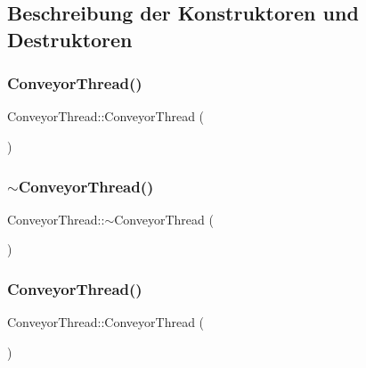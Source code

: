 \subsection{Beschreibung der Konstruktoren und Destruktoren}
\hypertarget{class_conveyor_thread_a2068e0741d46acdd2738d65447b594b6}{}\label{class_conveyor_thread_a2068e0741d46acdd2738d65447b594b6} 
\subsubsection{\texorpdfstring{Conveyor\+Thread()}{ConveyorThread()}\hspace{0.1cm}{\footnotesize\ttfamily [1/2]}}
{\footnotesize\ttfamily Conveyor\+Thread\+::\+Conveyor\+Thread (\begin{DoxyParamCaption}{ }\end{DoxyParamCaption})}

\hypertarget{class_conveyor_thread_ac496ae2a4708c7cd3af20721c1bf8b8a}{}\label{class_conveyor_thread_ac496ae2a4708c7cd3af20721c1bf8b8a} 
\subsubsection{\texorpdfstring{$\sim$\+Conveyor\+Thread()}{~ConveyorThread()}\hspace{0.1cm}{\footnotesize\ttfamily [1/2]}}
{\footnotesize\ttfamily Conveyor\+Thread\+::$\sim$\+Conveyor\+Thread (\begin{DoxyParamCaption}{ }\end{DoxyParamCaption})\hspace{0.3cm}{\ttfamily [virtual]}}

\hypertarget{class_conveyor_thread_a2068e0741d46acdd2738d65447b594b6}{}\label{class_conveyor_thread_a2068e0741d46acdd2738d65447b594b6} 
\subsubsection{\texorpdfstring{Conveyor\+Thread()}{ConveyorThread()}\hspace{0.1cm}{\footnotesize\ttfamily [2/2]}}
{\footnotesize\ttfamily Conveyor\+Thread\+::\+Conveyor\+Thread (\begin{DoxyParamCaption}{ }\end{DoxyParamCaption})}

